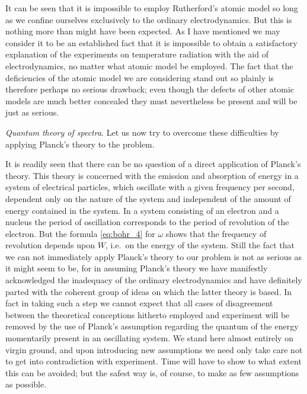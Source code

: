 It can be seen that it is impossible to employ Rutherford's atomic model
so long as we confine ourselves exclusively to the ordinary
electrodynamics. But this is nothing more than might have been expected.
As I have mentioned we may consider it to be an established fact that it
is impossible to obtain a satisfactory explanation of the experiments on
temperature radiation with the aid of electrodynamics, no matter what
atomic model be employed. The fact that the deficiencies of the atomic
model we are considering stand out so plainly is therefore perhaps no
serious drawback; even though the defects of other atomic models are
much better concealed they must nevertheless be present and will be just
as serious.

\emph{Quantum theory of spectra}. Let us now try to overcome these
difficulties by applying Planck's theory to the problem.

It is readily seen that there can be no question of a direct application
of Planck's theory. This theory is concerned with the emission and
absorption of energy in a system of electrical particles, which
oscillate with a given frequency per second, dependent only on the
nature of the system and independent of the amount of energy contained
in the system. In a system consisting of an electron and a nucleus the
period of oscillation corresponds to the period of revolution of the
electron. But the formula \eqref{eq:bohr_4} for $\omega$ shows that the frequency of
revolution depends upon $W$, i.e.\ on the energy of the system.
Still the fact that we can not immediately apply Planck's theory to our
problem is not as serious as it might seem to be, for in assuming
Planck's theory we have manifestly acknowledged the inadequacy of the
ordinary electrodynamics and have definitely parted with the coherent
group of ideas on which the latter theory is based. In fact in taking
such a step we cannot expect that all cases of disagreement between the
theoretical conceptions hitherto employed and experiment will be removed
by the use of Planck's assumption regarding the quantum of the energy
momentarily present in an oscillating system. We stand here almost
entirely on virgin ground, and upon introducing new assumptions we need
only take care not to get into contradiction with experiment. Time will
have to show to what extent this can be avoided; but the safest way is,
of course, to make as few assumptions as possible.

